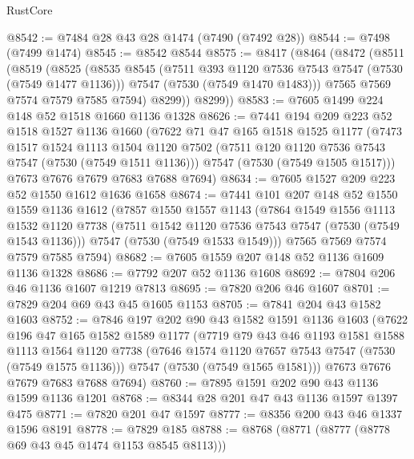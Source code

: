 \begin{lexlean}{RustCore}
\begin{coremodule}
@8542 := @7484 @28 @43 @28 @1474 (@7490 (@7492 @28))
@8544 := @7498 (@7499 @1474)
@8545 := @8542 @8544
@8575 := @8417
    (@8464
      (@8472
        (@8511
          (@8519
            (@8525
              (@8535
                @8545
                (@7511 @393 @1120 @7536 @7543 @7547 (@7530 (@7549 @1477 @1136)))
                @7547
                (@7530 (@7549 @1470 @1483)))
              @7565
              @7569
              @7574
              @7579
              @7585
              @7594)
            @8299))
        @8299))
@8583 := @7605 @1499 @224 @148 @52 @1518 @1660 @1136 @1328
@8626 := @7441
    @194
    @209
    @223
    @52
    @1518
    @1527
    @1136
    @1660
    (@7622
      @71
      @47
      @165
      @1518
      @1525
      @1177
      (@7473
        @1517
        @1524
        @1113
        @1504
        @1120
        @7502
        (@7511 @120 @1120 @7536 @7543 @7547 (@7530 (@7549 @1511 @1136)))
        @7547
        (@7530 (@7549 @1505 @1517)))
      @7673
      @7676
      @7679
      @7683
      @7688
      @7694)
@8634 := @7605 @1527 @209 @223 @52 @1550 @1612 @1636 @1658
@8674 := @7441
    @101
    @207
    @148
    @52
    @1550
    @1559
    @1136
    @1612
    (@7857
      @1550
      @1557
      @1143
      (@7864
        @1549
        @1556
        @1113
        @1532
        @1120
        @7738
        (@7511 @1542 @1120 @7536 @7543 @7547 (@7530 (@7549 @1543 @1136)))
        @7547
        (@7530 (@7549 @1533 @1549)))
      @7565
      @7569
      @7574
      @7579
      @7585
      @7594)
@8682 := @7605 @1559 @207 @148 @52 @1136 @1609 @1136 @1328
@8686 := @7792 @207 @52 @1136 @1608
@8692 := @7804 @206 @46 @1136 @1607 @1219 @7813
@8695 := @7820 @206 @46 @1607
@8701 := @7829 @204 @69 @43 @45 @1605 @1153
@8705 := @7841 @204 @43 @1582 @1603
@8752 := @7846
    @197
    @202
    @90
    @43
    @1582
    @1591
    @1136
    @1603
    (@7622
      @196
      @47
      @165
      @1582
      @1589
      @1177
      (@7719
        @79
        @43
        @46
        @1193
        @1581
        @1588
        @1113
        @1564
        @1120
        @7738
        (@7646 @1574 @1120 @7657 @7543 @7547 (@7530 (@7549 @1575 @1136)))
        @7547
        (@7530 (@7549 @1565 @1581)))
      @7673
      @7676
      @7679
      @7683
      @7688
      @7694)
@8760 := @7895 @1591 @202 @90 @43 @1136 @1599 @1136 @1201
@8768 := @8344 @28 @201 @47 @43 @1136 @1597 @1397 @475
@8771 := @7820 @201 @47 @1597
@8777 := @8356 @200 @43 @46 @1337 @1596 @8191
@8778 := @7829 @185
@8788 := @8768 (@8771 (@8777 (@8778 @69 @43 @45 @1474 @1153 @8545 @8113)))

\end{coremodule}
\end{lexlean}
